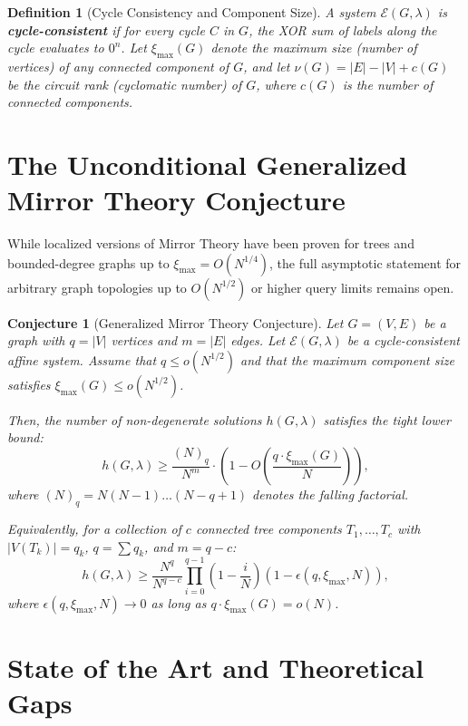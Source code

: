 \documentclass[11pt,a4paper]{article}
\newtheorem{conjecture}{Conjecture}
\newtheorem{definition}{Definition}
\begin{document}
\begin{definition}[Cycle Consistency and Component Size]
A system $\mathcal{E}(G, \lambda)$ is \textbf{cycle-consistent} if for every cycle $C$ in $G$, the XOR sum of labels along the cycle evaluates to $0^n$. Let $\xi_{\max}(G)$ denote the maximum size (number of vertices) of any connected component of $G$, and let $\nu(G) = |E| - |V| + c(G)$ be the circuit rank (cyclomatic number) of $G$, where $c(G)$ is the number of connected components.
\end{definition}

\section{The Unconditional Generalized Mirror Theory Conjecture}

While localized versions of Mirror Theory have been proven for trees and bounded-degree graphs up to $\xi_{\max} = O(N^{1/4})$, the full asymptotic statement for arbitrary graph topologies up to $O(N^{1/2})$ or higher query limits remains open.

\begin{conjecture}[Generalized Mirror Theory Conjecture]
Let $G = (V, E)$ be a graph with $q = |V|$ vertices and $m = |E|$ edges. Let $\mathcal{E}(G, \lambda)$ be a cycle-consistent affine system. Assume that $q \le o(N^{1/2})$ and that the maximum component size satisfies $\xi_{\max}(G) \le o(N^{1/2})$.

Then, the number of non-degenerate solutions $h(G, \lambda)$ satisfies the tight lower bound:
\begin{equation}
h(G, \lambda) \ge \frac{(N)_{q}}{N^m} \cdot \left( 1 - O\left( \frac{q \cdot \xi_{\max}(G)}{N} \right) \right),
\end{equation}
where $(N)_q = N(N-1)\dots(N-q+1)$ denotes the falling factorial.

Equivalently, for a collection of $c$ connected tree components $T_1, \dots, T_c$ with $|V(T_k)| = q_k$, $q = \sum q_k$, and $m = q - c$:
\begin{equation}
h(G, \lambda) \ge \frac{N^q}{N^{q-c}} \prod_{i=0}^{q-1} \left(1 - \frac{i}{N}\right) \left( 1 - \epsilon(q, \xi_{\max}, N) \right),
\end{equation}
where $\epsilon(q, \xi_{\max}, N) \to 0$ as long as $q \cdot \xi_{\max}(G) = o(N)$.
\end{conjecture}

\section{State of the Art and Theoretical Gaps}
\end{document}
